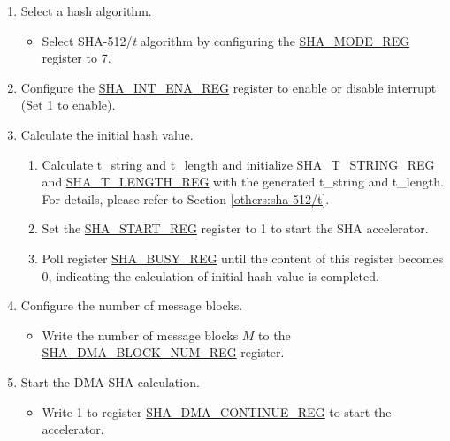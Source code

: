 \begin{enumerate}
    \item Select a hash algorithm.
    \begin{itemize}
        \item Select SHA-512/{\it{t}} algorithm by configuring the \hyperref[regdesc:SHAMODEREG]{SHA\_MODE\_REG} register to 7.
    \end{itemize}
    
    \item Configure the \hyperref[regdesc:SHAINTENAREG]{SHA\_INT\_ENA\_REG} register to enable or disable interrupt (Set 1 to enable).
    
    \item Calculate the initial hash value.    
        \begin{enumerate}
            \item Calculate t\_string and t\_length and initialize \hyperref[regdesc:SHATSTRINGREG]{SHA\_T\_STRING\_REG} and  \hyperref[regdesc:SHATLENGTHREG]{SHA\_T\_LENGTH\_REG} with the generated t\_string and t\_length. For details, please refer to Section \ref{others:sha-512/t}.
            \item Set the \hyperref[regdesc:SHASTARTREG]{SHA\_START\_REG} register to 1 to start the SHA accelerator.
            \item Poll register \hyperref[regdesc:SHABUSYREG]{SHA\_BUSY\_REG} until the content of this register becomes 0, indicating the calculation of initial hash value is completed.
        \end{enumerate}
    
    \item Configure the number of message blocks.
    \begin{itemize}
        \item  Write the number of message blocks \begin{math}M\end{math} to the  \hyperref[regdesc:SHADMABLOCKNUMREG]{SHA\_DMA\_BLOCK\_NUM\_REG} register.
    \end{itemize}
    
    \item Start the DMA-SHA calculation.
        \begin{itemize}
            \item Write 1 to register \hyperref[regdesc:SHADMACONTINUEREG]{SHA\_DMA\_CONTINUE\_REG} to start the accelerator.
        \end{itemize}
    

\end{enumerate}
